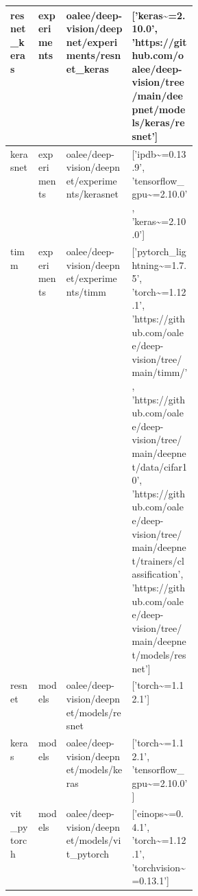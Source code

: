 \begin{figure}[H]
\begin{tabular}{|l|l|l|p{0.35\linewidth}|}
  \hline 
 
 resnet\_keras   & experiments & oalee/deep-vision/deepnet/experiments/resnet\_keras & ['keras\textasciitilde{}=2.10.0', 'https://github.com/oalee/deep-vision/tree/main/deepnet/models/keras/resnet']                                                                                                                                                                                                                                              \\
  \hline 
 kerasnet       & experiments & oalee/deep-vision/deepnet/experiments/kerasnet     & ['ipdb\textasciitilde{}=0.13.9', 'tensorflow\_gpu\textasciitilde{}=2.10.0', 'keras\textasciitilde{}=2.10.0']                                                                                                                                                                                                                                                                                  \\
  \hline 
 timm           & experiments & oalee/deep-vision/deepnet/experiments/timm         & ['pytorch\_lightning\textasciitilde{}=1.7.5', 'torch\textasciitilde{}=1.12.1', 'https://github.com/oalee/deep-vision/tree/main/timm/', 'https://github.com/oalee/deep-vision/tree/main/deepnet/data/cifar10', 'https://github.com/oalee/deep-vision/tree/main/deepnet/trainers/classification', 'https://github.com/oalee/deep-vision/tree/main/deepnet/models/resnet']       \\
 resnet         & models      & oalee/deep-vision/deepnet/models/resnet            & ['torch\textasciitilde{}=1.12.1']                                                                                                                                                                                                                                                                                                                            \\
  \hline 
 keras          & models      & oalee/deep-vision/deepnet/models/keras             & ['torch\textasciitilde{}=1.12.1', 'tensorflow\_gpu\textasciitilde{}=2.10.0']                                                                                                                                                                                                                                                                                                  \\
  \hline 
 vit\_pytorch    & models      & oalee/deep-vision/deepnet/models/vit\_pytorch       & ['einops\textasciitilde{}=0.4.1', 'torch\textasciitilde{}=1.12.1', 'torchvision\textasciitilde{}=0.13.1']                                                                                                                                                                                                                                                                                    \\

\end{tabular}
\end{figure}
